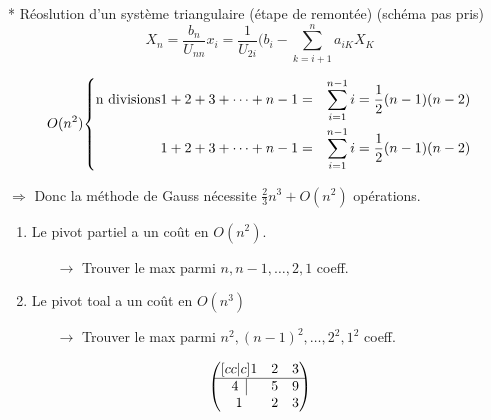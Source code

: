 \documentclass[a4paper,11pt]{article}
\newenvironment{lcases}
  {\left\lbrace\begin{aligned}}
  {\end{aligned}\right.}
\theoremstyle{plain} %
\begin{document}
* Réoslution d'un système triangulaire (étape de remontée)
(schéma pas pris)
\[
    X_n = \frac{b_n}{U_{nn}}
    x_i = \frac{1}{U_{2i}}(b_i - \sum_{k=i+1}^n a_{iK}X_K
\]

\begin{equation*}
    \text{$O(n^2)$}
    \begin{lcases}
        \text{n divisions}
        1 + 2 + 3 + \dots + n - 1 & = & \sum_{i=1}^{n-1}i = \frac{1}{2}(n-1)(n-2)\\
        1 + 2 + 3 + \dots + n - 1 & = & \sum_{i=1}^{n-1}i = \frac{1}{2}(n-1)(n-2)
    \end{lcases}
\end{equation*}

$\Rightarrow$ Donc la méthode de Gauss nécessite $\frac{2}{3}n^3+O(n^2)$ opérations.

\vspace{0.5cm}
\begin{remark}
    \begin{enumerate}
        \item Le pivot partiel a un coût en $O(n^2)$.
            \begin{itemize}
                \item [$\rightarrow$] Trouver le max parmi $n,n-1, \dots, 2, 1$ coeff.
            \end{itemize}

        \item Le pivot toal a un coût en $O(n^3)$
            \begin{itemize}
                \item [$\rightarrow$] Trouver le max parmi $n^2, (n-1)^2, \dots , 2^2, 1^2$ coeff.
            \end{itemize}
    \end{enumerate}
\end{remark}

\[
   \begin{pmatrix}[cc|c]
  1 & 2 & 3\\
  \hline
  4 \; \; \vline & 5 & 9 \\
  1 & 2 & 3
\end{pmatrix} 
\]
\end{document}
